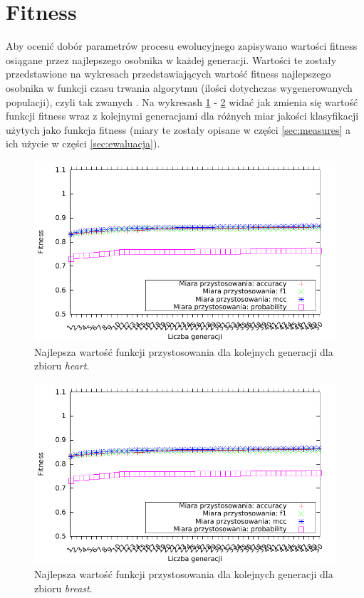\FloatBarrier
\section{Fitness}
Aby ocenić dobór parametrów procesu ewolucyjnego zapisywano wartości fitness osiągane przez najlepszego osobnika w każdej generacji. Wartości te zostały przedstawione na wykresach przedstawiających wartość fitness najlepszego osobnika w funkcji czasu trwania algorytmu (ilości dotychczas wygenerowanych populacji), czyli tak zwanych . Na wykresash \ref{fig:fit-heart} - \ref{fig:fit-breast} widać jak zmienia się wartość funkcji fitness wraz z kolejnymi generacjami dla różnych miar jakości klasyfikacji użytych jako funkcja fitness (miary te zostały opisane w części \ref{sec:measures} a ich użycie w części \ref{sec:ewaluacja}).

	\begin{figure}
		\includegraphics[scale=0.90]{figures/results/fitness/fitness-heart}
		\caption{Najlepsza wartość funkcji przystosowania dla kolejnych generacji dla zbioru \emph{heart}.\label{fig:fit-heart}}
	\end{figure}
	
	\begin{figure}
		\includegraphics[scale=0.90]{figures/results/fitness/fitness-breast}
		\caption{Najlepsza wartość funkcji przystosowania dla kolejnych generacji dla zbioru \emph{breast}.\label{fig:fit-breast}}
	\end{figure}	

